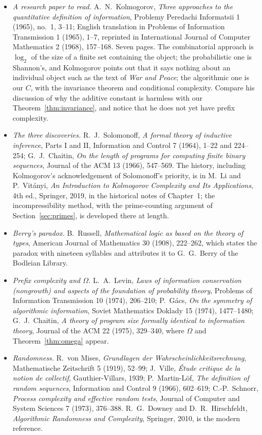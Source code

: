 \begin{itemize}
\item \emph{A research paper to read.} A.~N.~Kolmogorov, \emph{Three approaches to the quantitative definition of information}, Problemy Peredachi Informatsii 1 (1965), no.~1, 3--11; English translation in Problems of Information Transmission 1 (1965), 1--7, reprinted in International Journal of Computer Mathematics 2 (1968), 157--168. Seven pages. The combinatorial approach is $\log_2$ of the size of a finite set containing the object; the probabilistic one is Shannon's, and Kolmogorov points out that it says nothing about an individual object such as the text of \emph{War and Peace}; the algorithmic one is our $C$, with the invariance theorem and conditional complexity. Compare his discussion of why the additive constant is harmless with our Theorem~\ref{thm:invariance}, and notice that he does not yet have prefix complexity.
\item \emph{The three discoveries.} R.~J.~Solomonoff, \emph{A formal theory of inductive inference}, Parts I and II, Information and Control 7 (1964), 1--22 and 224--254; G.~J.~Chaitin, \emph{On the length of programs for computing finite binary sequences}, Journal of the ACM 13 (1966), 547--569. The history, including Kolmogorov's acknowledgement of Solomonoff's priority, is in M.~Li and P.~Vitányi, \emph{An Introduction to Kolmogorov Complexity and Its Applications}, 4th ed., Springer, 2019, in the historical notes of Chapter~1; the incompressibility method, with the prime-counting argument of Section~\ref{sec:primes}, is developed there at length.
\item \emph{Berry's paradox.} B.~Russell, \emph{Mathematical logic as based on the theory of types}, American Journal of Mathematics 30 (1908), 222--262, which states the paradox with nineteen syllables and attributes it to G.~G.~Berry of the Bodleian Library.
\item \emph{Prefix complexity and $\Omega$.} L.~A.~Levin, \emph{Laws of information conservation (nongrowth) and aspects of the foundation of probability theory}, Problems of Information Transmission 10 (1974), 206--210; P.~Gács, \emph{On the symmetry of algorithmic information}, Soviet Mathematics Doklady 15 (1974), 1477--1480; G.~J.~Chaitin, \emph{A theory of program size formally identical to information theory}, Journal of the ACM 22 (1975), 329--340, where $\Omega$ and Theorem~\ref{thm:omega} appear.
\item \emph{Randomness.} R.~von Mises, \emph{Grundlagen der Wahrscheinlichkeitsrechnung}, Mathematische Zeitschrift 5 (1919), 52--99; J.~Ville, \emph{Étude critique de la notion de collectif}, Gauthier-Villars, 1939; P.~Martin-Löf, \emph{The definition of random sequences}, Information and Control 9 (1966), 602--619; C.-P.~Schnorr, \emph{Process complexity and effective random tests}, Journal of Computer and System Sciences 7 (1973), 376--388. R.~G.~Downey and D.~R.~Hirschfeldt, \emph{Algorithmic Randomness and Complexity}, Springer, 2010, is the modern reference.

\end{itemize}
